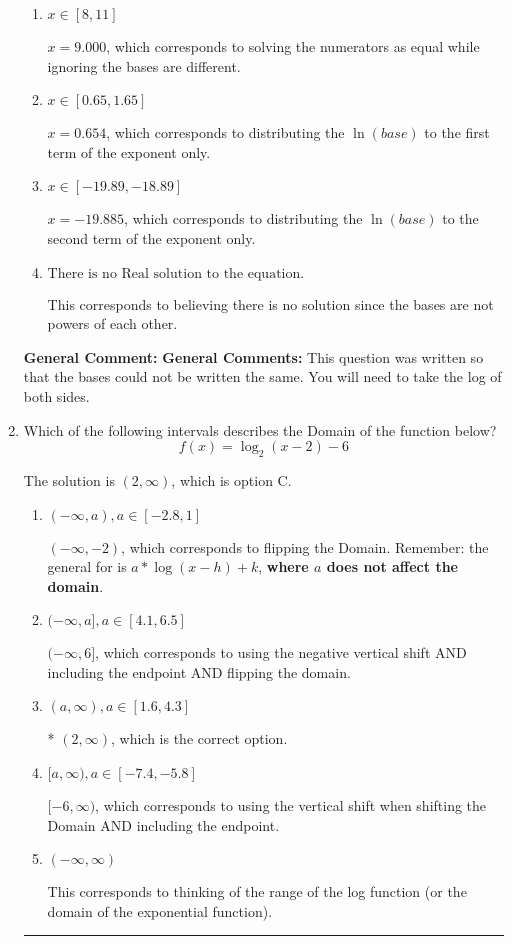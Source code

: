 \documentclass{extbook}[14pt]
\newcommand{\litem}[1]{\item #1

\rule{\textwidth}{0.4pt}}
\begin{document}
\begin{enumerate}
{\begin{enumerate}[label=\Alph*.]
* $x = -1.446$, which is the correct option.
\item \( x \in [8, 11] \)

$x = 9.000$, which corresponds to solving the numerators as equal while ignoring the bases are different.
\item \( x \in [0.65, 1.65] \)

$x = 0.654$, which corresponds to distributing the $\ln(base)$ to the first term of the exponent only.
\item \( x \in [-19.89, -18.89] \)

$x = -19.885$, which corresponds to distributing the $\ln(base)$ to the second term of the exponent only.
\item \( \text{There is no Real solution to the equation.} \)

This corresponds to believing there is no solution since the bases are not powers of each other.
\end{enumerate}

\textbf{General Comment:} \textbf{General Comments:} This question was written so that the bases could not be written the same. You will need to take the log of both sides.
}
\litem{
Which of the following intervals describes the Domain of the function below?
\[ f(x) = \log_2{(x-2)}-6 \]

The solution is \( (2, \infty) \), which is option C.\begin{enumerate}[label=\Alph*.]
\item \( (-\infty, a), a \in [-2.8, 1] \)

$(-\infty, -2)$, which corresponds to flipping the Domain. Remember: the general for is $a*\log(x-h)+k$, \textbf{where $a$ does not affect the domain}.
\item \( (-\infty, a], a \in [4.1, 6.5] \)

$(-\infty, 6]$, which corresponds to using the negative vertical shift AND including the endpoint AND flipping the domain.
\item \( (a, \infty), a \in [1.6, 4.3] \)

* $(2, \infty)$, which is the correct option.
\item \( [a, \infty), a \in [-7.4, -5.8] \)

$[-6, \infty)$, which corresponds to using the vertical shift when shifting the Domain AND including the endpoint.
\item \( (-\infty, \infty) \)

This corresponds to thinking of the range of the log function (or the domain of the exponential function).
\end{enumerate}

}
\end{enumerate}
\end{document}
